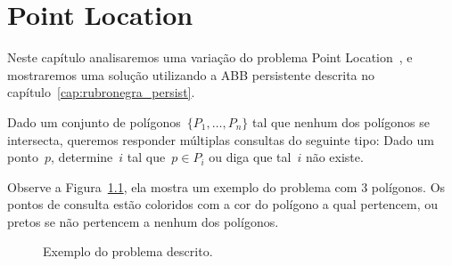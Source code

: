 \documentclass[main.tex]{subfiles}
\begin{document}
\chapter{Point Location}

Neste capítulo analisaremos uma variação do problema Point Location~\cite{SarnakT1986}, e mostraremos uma solução utilizando a ABB persistente descrita no capítulo~\ref{cap:rubronegra_persist}.

Dado um conjunto de polígonos~${\{P_1, \ldots, P_n\}}$ tal que nenhum dos polígonos se intersecta, queremos responder múltiplas consultas do seguinte tipo: Dado um ponto~$p$, determine~$i$ tal que~${p \in P_i}$ ou diga que tal~$i$ não existe.

Observe a Figura~\ref{fig:exemplo_pl}, ela mostra um exemplo do problema com 3 polígonos. Os pontos de consulta estão coloridos com a cor do polígono a qual pertencem, ou pretos se não pertencem a nenhum dos polígonos.



\begin{figure}
\centering
{}
\caption{Exemplo do problema descrito.} \label{fig:exemplo_pl}
\end{figure}
\end{document}
